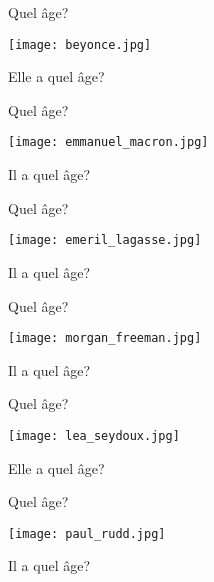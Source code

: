 \begin{frame}{Quel âge?}
  \begin{center}
    \texttt{[image: beyonce.jpg]}

    Elle a quel âge? \underline{} \\
  \end{center}
\end{frame}

\begin{frame}{Quel âge?}
  \begin{center}
    \texttt{[image: emmanuel\_macron.jpg]}

    Il a quel âge? \underline{} \\
  \end{center}
\end{frame}

\begin{frame}{Quel âge?}
  \begin{center}
    \texttt{[image: emeril\_lagasse.jpg]}

    Il a quel âge? \underline{}
  \end{center}
\end{frame}

\begin{frame}{Quel âge?}
  \begin{center}
    \texttt{[image: morgan\_freeman.jpg]}

    Il a quel âge? \underline{} \\
  \end{center}
\end{frame}

\begin{frame}{Quel âge?}
  \begin{center}
    \texttt{[image: lea\_seydoux.jpg]}

    Elle a quel âge? \underline{}
  \end{center}
\end{frame}

\begin{frame}{Quel âge?}
  \begin{center}
    \texttt{[image: paul\_rudd.jpg]}

    Il a quel âge? \underline{} \\
  \end{center}
\end{frame}